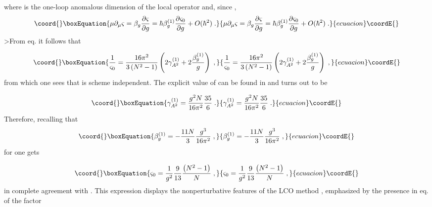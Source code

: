\documentclass[a4paper,12pt]{article}
\begin{document}
where \coordHE{} is the one-loop anomalous dimension of the
local operator \coordHE{} and, since \coordHE{}, 
\begin{equation}\coord{}\boxEquation{
\mu \partial _{\mu }\varsigma =\beta _{g}\frac{\partial \varsigma }{\partial
g}=\hbar \beta _{g}^{(1)}\frac{\partial \varsigma _{0}}{\partial g}+O(\hbar
^{2})\;.  \label{mdxi}
}{
\mu \partial _{\mu }\varsigma =\beta _{g}\frac{\partial \varsigma }{\partial
g}=\hbar \beta _{g}^{(1)}\frac{\partial \varsigma _{0}}{\partial g}+O(\hbar
^{2})\;.  }{ecuacion}\coordE{}\end{equation}
>From eq.\myHighlight{$\left( \ref{aeq}\right) $}\coordHE{} it follows that

\begin{equation}\coord{}\boxEquation{
\frac{1}{\varsigma _{0}}=\frac{16\pi ^{2}}{3\left( N^{2}-1\right) }\left(
2\gamma _{A^{2}}^{(1)}+2\frac{\beta _{g}^{(1)}}{g}\right) \;,  \label{ffxi0}
}{
\frac{1}{\varsigma _{0}}=\frac{16\pi ^{2}}{3\left( N^{2}-1\right) }\left(
2\gamma _{A^{2}}^{(1)}+2\frac{\beta _{g}^{(1)}}{g}\right) \;,  }{ecuacion}\coordE{}\end{equation}
from which one sees that \coordHE{} is scheme independent. The
explicit value of \coordHE{} can be found in \cite{v1,gr,dsv}
and turns out to be

\begin{equation}\coord{}\boxEquation{
\gamma _{A^{2}}^{(1)}=\frac{g^{2}N}{16\pi ^{2}}\frac{35}{6}\;.  \label{ga}
}{
\gamma _{A^{2}}^{(1)}=\frac{g^{2}N}{16\pi ^{2}}\frac{35}{6}\;.  }{ecuacion}\coordE{}\end{equation}
Therefore, recalling that 
\begin{equation}\coord{}\boxEquation{
\beta _{g}^{(1)}=-\frac{11N}{3}\frac{g^{3}}{16\pi ^{2}}\;,  \label{betasun}
}{
\beta _{g}^{(1)}=-\frac{11N}{3}\frac{g^{3}}{16\pi ^{2}}\;,  }{ecuacion}\coordE{}\end{equation}
for \coordHE{} one gets

\begin{equation}\coord{}\boxEquation{
\varsigma _{0}=\frac{1}{g^{2}}\frac{9}{13}\frac{\left( N^{2}-1\right) }{N}\;,
\label{lc}
}{
\varsigma _{0}=\frac{1}{g^{2}}\frac{9}{13}\frac{\left( N^{2}-1\right) }{N}\;,
}{ecuacion}\coordE{}\end{equation}
in complete agreement with \cite{v1}. This expression displays the
nonperturbative features of the LCO method \cite{v1}, emphasized by the
presence in eq.\myHighlight{$\left( \ref{lc}\right) $}\coordHE{} of the factor \coordHE{}
\end{document}
